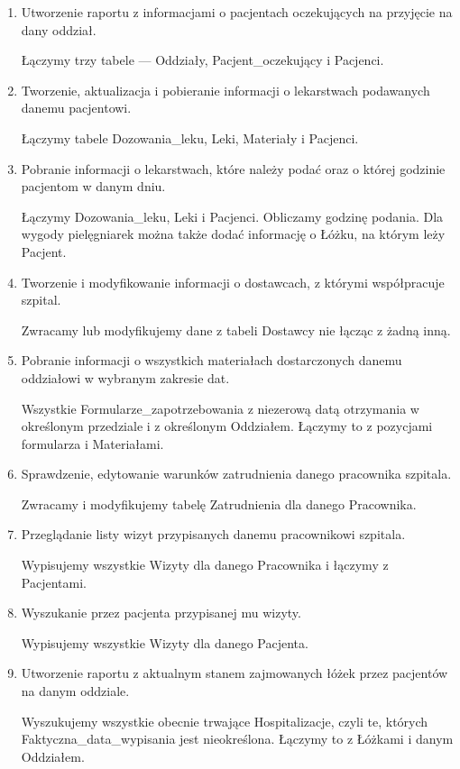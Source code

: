 \begin{enumerate}
\item Utworzenie raportu z informacjami o pacjentach oczekujących na przyjęcie na dany oddział.

Łączymy trzy tabele --- Oddziały, Pacjent\_oczekujący i Pacjenci.

\item Tworzenie, aktualizacja i pobieranie informacji o lekarstwach podawanych danemu pacjentowi.

Łączymy tabele Dozowania\_leku, Leki, Materiały i Pacjenci.

\item Pobranie informacji o lekarstwach, które należy podać oraz o której godzinie pacjentom w danym dniu.

Łączymy Dozowania\_leku, Leki i Pacjenci. Obliczamy godzinę podania. Dla wygody pielęgniarek można także dodać informację o Łóżku, na którym leży Pacjent.

\item Tworzenie i  modyfikowanie informacji o dostawcach, z którymi współpracuje szpital.

Zwracamy lub modyfikujemy dane z tabeli Dostawcy nie łącząc z żadną inną.

\item Pobranie informacji o wszystkich materiałach dostarczonych danemu oddziałowi w wybranym zakresie dat.

Wszystkie Formularze\_zapotrzebowania z niezerową datą otrzymania w określonym przedziale i z określonym Oddziałem. Łączymy to z pozycjami formularza i Materiałami.

\item Sprawdzenie, edytowanie warunków zatrudnienia danego pracownika szpitala.

Zwracamy i modyfikujemy tabelę Zatrudnienia dla danego Pracownika.

\item Przeglądanie listy wizyt przypisanych danemu pracownikowi szpitala.

Wypisujemy wszystkie Wizyty dla danego Pracownika i łączymy z Pacjentami.

\item Wyszukanie przez pacjenta przypisanej mu wizyty.

Wypisujemy wszystkie Wizyty dla danego Pacjenta.

\item Utworzenie raportu z aktualnym stanem zajmowanych łóżek przez pacjentów na danym oddziale.

Wyszukujemy wszystkie obecnie trwające Hospitalizacje, czyli te, których Faktyczna\_data\_wypisania jest nieokreślona. Łączymy to z Łóżkami i danym Oddziałem.

\end{enumerate}

